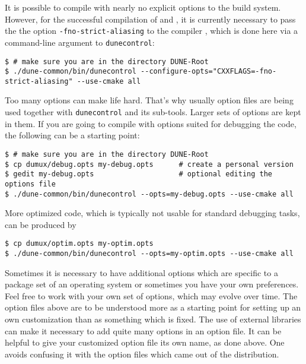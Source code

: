 It is possible to compile \Dumux with nearly no explicit options to the build system.
However, for the successful compilation of \Dune and \Dumux, it is currently necessary to pass the
the option \texttt{-fno-strict-aliasing} to the \Cplusplus compiler
\cite{WIKIPED-ALIASING}, which is done here via a command-line argument to \texttt{dunecontrol}:
\begin{lstlisting}[style=Bash]
$ # make sure you are in the directory DUNE-Root
$ ./dune-common/bin/dunecontrol --configure-opts="CXXFLAGS=-fno-strict-aliasing" --use-cmake all
\end{lstlisting}

Too many options can make life hard. That's why usually option files are being used together with \texttt{dunecontrol} and its sub-tools.
Larger sets of options are kept in them. If you are going to compile with options suited for debugging the code, the following
can be a starting point:
\begin{lstlisting}[style=Bash]
$ # make sure you are in the directory DUNE-Root
$ cp dumux/debug.opts my-debug.opts      # create a personal version
$ gedit my-debug.opts                    # optional editing the options file
$ ./dune-common/bin/dunecontrol --opts=my-debug.opts --use-cmake all
\end{lstlisting}

More optimized code, which is typically not usable for standard debugging tasks, can be produced by
\begin{lstlisting}[style=Bash]
$ cp dumux/optim.opts my-optim.opts
$ ./dune-common/bin/dunecontrol --opts=my-optim.opts --use-cmake all
\end{lstlisting}

Sometimes it is necessary to have additional options which
are specific to a package set of an operating system or
sometimes you have your own preferences.
Feel free to work with your own set of options, which may evolve over time.
The option files above are to be understood more as a starting point
for setting up an own customization than as something which is fixed.
The use of external libraries can make it necessary to add quite many options in an option file.
It can be helpful to give your customized option file its own name, as done above.
One avoids confusing it with the option files which came out of the distribution.


